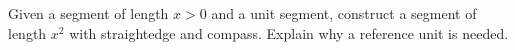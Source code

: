 Given a segment of length $x>0$ and a unit segment, construct a segment of length $x^2$ with straightedge and compass. Explain why a reference unit is needed.
